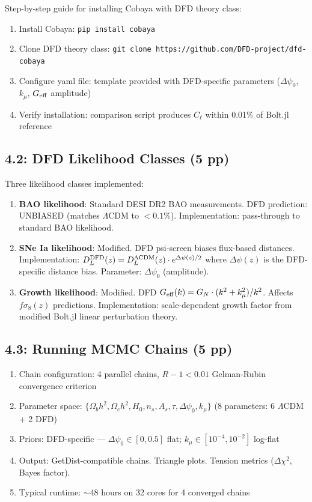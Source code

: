 \documentclass[11pt,a4paper]{article}
\begin{document}
Step-by-step guide for installing Cobaya with DFD theory class:

\begin{enumerate}
\item Install Cobaya: \texttt{pip install cobaya}
\item Clone DFD theory class: \texttt{git clone https://github.com/DFD-project/dfd-cobaya}
\item Configure yaml file: template provided with DFD-specific parameters ($\Delta\psi_0$, $k_\mu$, $G_{\rm eff}$ amplitude)
\item Verify installation: comparison script produces $C_\ell$ within 0.01\% of Bolt.jl reference
\end{enumerate}

\subsection{4.2: DFD Likelihood Classes (5 pp)}

Three likelihood classes implemented:

\begin{enumerate}
\item \textbf{BAO likelihood}: Standard DESI DR2 BAO measurements. DFD prediction: UNBIASED (matches $\Lambda$CDM to $< 0.1\%$). Implementation: pass-through to standard BAO likelihood.

\item \textbf{SNe Ia likelihood}: Modified. DFD psi-screen biases flux-based distances. Implementation: $D_L^{\rm DFD}(z) = D_L^{\Lambda\text{CDM}}(z) \cdot e^{\Delta\psi(z)/2}$ where $\Delta\psi(z)$ is the DFD-specific distance bias. Parameter: $\Delta\psi_0$ (amplitude).

\item \textbf{Growth likelihood}: Modified. DFD $G_{\rm eff}(k) = G_N \cdot (k^2 + k_\mu^2)/k^2$. Affects $f\sigma_8(z)$ predictions. Implementation: scale-dependent growth factor from modified Bolt.jl linear perturbation theory.
\end{enumerate}

\subsection{4.3: Running MCMC Chains (5 pp)}

\begin{enumerate}
\item Chain configuration: 4 parallel chains, $R - 1 < 0.01$ Gelman-Rubin convergence criterion
\item Parameter space: $\{\Omega_b h^2, \Omega_c h^2, H_0, n_s, A_s, \tau, \Delta\psi_0, k_\mu\}$ (8 parameters: 6 $\Lambda$CDM + 2 DFD)
\item Priors: DFD-specific --- $\Delta\psi_0 \in [0, 0.5]$ flat; $k_\mu \in [10^{-4}, 10^{-2}]$ log-flat
\item Output: GetDist-compatible chains. Triangle plots. Tension metrics ($\Delta\chi^2$, Bayes factor).
\item Typical runtime: $\sim$48 hours on 32 cores for 4 converged chains
\end{enumerate}
\end{document}
